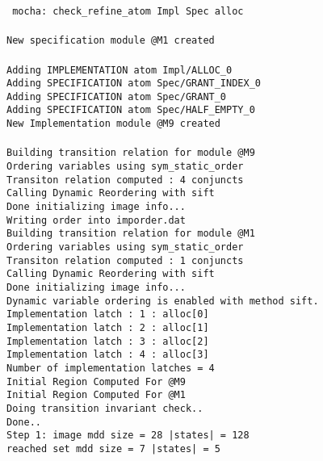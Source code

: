 \mypar
\noindent
{\tt
mocha: check\_refine\_atom  Impl Spec alloc \\
\\
New specification module @M1 created \\
\\
Adding IMPLEMENTATION atom Impl/ALLOC\_0 \\
Adding SPECIFICATION  atom Spec/GRANT\_INDEX\_0 \\
Adding SPECIFICATION  atom Spec/GRANT\_0 \\
Adding SPECIFICATION  atom Spec/HALF\_EMPTY\_0\\
New Implementation module @M9 created \\
\\
Building transition relation for module @M9 \\
Ordering variables using sym\_static\_order \\
Transiton relation computed : 4 conjuncts \\
Calling Dynamic Reordering with sift \\
Done initializing image info... \\
Writing order into imporder.dat \\
Building transition relation for module @M1 \\
Ordering variables using sym\_static\_order \\
Transiton relation computed : 1 conjuncts \\
Calling Dynamic Reordering with sift \\
Done initializing image info... \\
Dynamic variable ordering is enabled with method sift. \\
Implementation latch : 1 : alloc[0] \\
Implementation latch : 2 : alloc[1] \\
Implementation latch : 3 : alloc[2] \\
Implementation latch : 4 : alloc[3] \\
Number of implementation latches = 4 \\
Initial Region Computed For @M9 \\
Initial Region Computed For @M1 \\
Doing transition invariant check.. \\
Done.. \\
Step 1: image mdd size =         28	 |states| =      128	 \\
reached set mdd size =          7	 |states| =        5 \\
}
